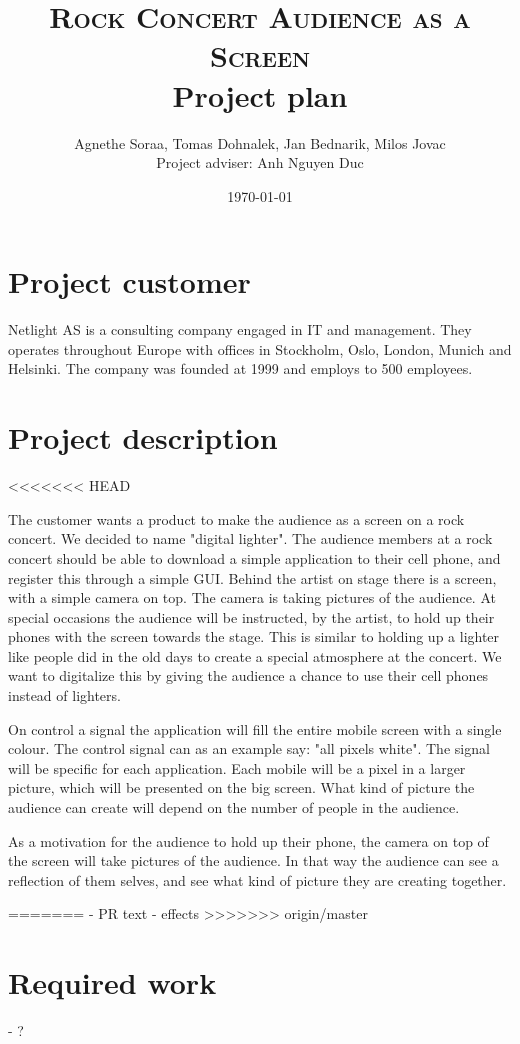 \documentclass{article}
\title{
    \normalsize \textsc{Rock Concert Audience as a Screen}\\
    \Huge Project plan}
\author{Agnethe Soraa,
Tomas Dohnalek,
Jan Bednarik,
Milos Jovac \\
\normalsize Project adviser: Anh Nguyen Duc}
\date{\today}
\begin{document}
\maketitle
\section{Project customer}
Netlight AS is a consulting company engaged in IT and management. They operates throughout Europe with offices in Stockholm, Oslo, London, Munich and Helsinki. The company was founded at 1999 and employs to 500 employees.

\section{Project description}
<<<<<<< HEAD

The customer wants a product to make the audience as a screen on a rock concert. We decided to name "digital lighter". 
The audience members at a rock concert should be able to download a simple application to their cell phone, and register this through a simple GUI.
Behind the artist on stage there is a screen, with a simple camera on top. The camera is taking pictures of the audience. 
At special occasions the audience will be instructed, by the artist, to hold up their phones with the screen towards the stage.
This is similar to holding up a lighter like people did in the old days to create a special atmosphere at the concert. 
We want to digitalize this by giving the audience a chance to use their cell phones instead of lighters. 

On control a signal the application will fill the entire mobile screen with a single colour.
The control signal can as an example say: "all pixels white". The signal will be specific for each application.
Each mobile will be a pixel in a larger picture, which will be presented on the big screen. 
What kind of picture the audience can create will depend on the number of people in the audience.   

As a motivation for the audience to hold up their phone, the camera on top of the screen will take pictures of the audience.
In that way the audience can see a reflection of them selves, and see what kind of picture they are creating together.  

=======
- PR text
- effects
>>>>>>> origin/master

\section{Required work}
- ?
\end{document}
